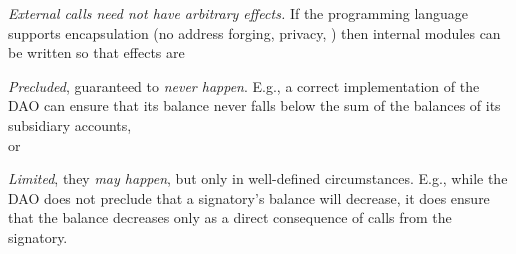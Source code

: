 %
% 
%

 
 {\em{External calls  need not have  arbitrary   effects.}}
If the programming language supports encapsulation (\eg no address forging, privacy,
 \etc) then internal modules can be  written %
so  that effects are  %

 \begin{customquote}
\emph{Precluded}, \ie  guaranteed to \emph{never happen}.
 E.g., a  correct  %
 implementation of the DAO  \cite{Dao}  can ensure that  
 its balance never falls below the sum of the balances of its subsidiary accounts, \\ or


 \emph{Limited}, \ie  they  \emph{may happen}, but
 only in well-defined circumstances.
E.g., while the DAO does not preclude that a signatory's balance will decrease, it  does ensure that the balance decreases only
as a direct consequence of calls from the signatory.
 
 \end{customquote}
 

